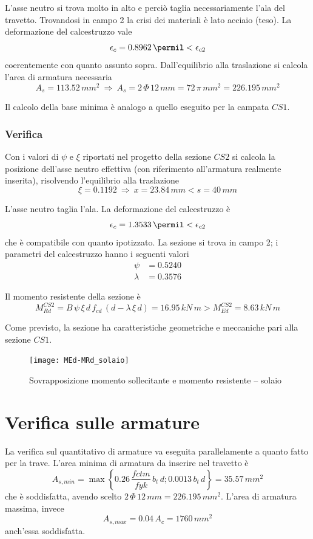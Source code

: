 L'asse neutro si trova molto in alto e perciò taglia necessariamente l'ala del travetto. Trovandosi in campo 2 la crisi dei materiali è lato acciaio (teso). La deformazione del calcestruzzo vale
\[
\epsilon_c = 0.8962\,\permil < \epsilon_{c2}
\]
coerentemente con quanto assunto sopra. Dall'equilibrio alla traslazione si calcola l'area di armatura necessaria
\[
    A_s = 113.52\,mm^2~\Longrightarrow~A_s = 2\,\Phi\,12\,mm = 72\,\pi\,mm^2 = 226.195\,mm^2
\]

Il calcolo della base minima è analogo a quello eseguito per la campata $CS1$.

\subsubsection{Verifica}
Con i valori di $\psi$ e $\xi$ riportati nel progetto della sezione $CS2$ si calcola la posizione dell'asse neutro effettiva (con riferimento all'armatura realmente inserita), risolvendo l'equilibrio alla traslazione 
\[
    \xi = 0.1192~\Longrightarrow~x = 23.84\,mm < s = 40\,mm
\]

L'asse neutro taglia l'ala. La deformazione del calcestruzzo è
\[
\epsilon_c = 1.3533\,\permil < \epsilon_{c2}
\]
che è compatibile con quanto ipotizzato. La sezione si trova in campo 2; i parametri del calcestruzzo hanno i seguenti valori
\begin{align*}
    \psi&= 0.5240\\
	\lambda &= 0.3576
\end{align*}

Il momento resistente della sezione è
\begin{equation}
	M_{Rd}^{CS2} = B\,\psi\,\xi\,d\,f_{cd}\,\left(d - \lambda\,\xi\,d\right) = 16.95\,kN\,m > M_{Ed}^{CS2} = 8.63\,kN\,m
\end{equation}

Come previsto, la sezione ha caratteristiche geometriche e meccaniche pari alla sezione $CS1$.
\begin{figure}
    \centering
	\texttt{[image: MEd-MRd\_solaio]}
	\caption{Sovrapposizione momento sollecitante e momento resistente -- solaio}
	\label{fig:MEd-MRd_solaio}
\end{figure}

\cleardoublepage
\section{Verifica sulle armature}
La verifica sul quantitativo di armature va eseguita parallelamente a quanto fatto per la trave. L'area minima di armatura da inserire nel travetto è
\[
A_{s,min} = \max\left\{0.26\,\dfrac{fctm}{fyk}\,b_t\,d; 0.0013\,b_t\,d\right\} = 35.57\,mm^2
\]
che è soddisfatta, avendo scelto $2\,\Phi\,12\,mm = 226.195\,mm^2$. L'area di armatura massima, invece
\[
A_{s,max} = 0.04\,A_c = 1760\,mm^2  
\]
anch'essa soddisfatta.

